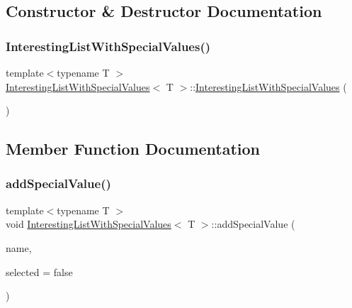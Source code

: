 \subsection{Constructor \& Destructor Documentation}
\mbox{\label{class_interesting_list_with_special_values_aac8922008e54bc7e28a392b1b85ead37}} 
\subsubsection{\texorpdfstring{InterestingListWithSpecialValues()}{InterestingListWithSpecialValues()}}
{\footnotesize\ttfamily template$<$typename T $>$ \\
\mbox{\hyperlink{class_interesting_list_with_special_values}{Interesting\+List\+With\+Special\+Values}}$<$ T $>$\+::\mbox{\hyperlink{class_interesting_list_with_special_values}{Interesting\+List\+With\+Special\+Values}} (\begin{DoxyParamCaption}{ }\end{DoxyParamCaption})\hspace{0.3cm}{\ttfamily [inline]}}



\subsection{Member Function Documentation}
\mbox{\label{class_interesting_list_with_special_values_a775cdd5ee99c643ebec718f41477d821}} 
\subsubsection{\texorpdfstring{addSpecialValue()}{addSpecialValue()}}
{\footnotesize\ttfamily template$<$typename T $>$ \\
void \mbox{\hyperlink{class_interesting_list_with_special_values}{Interesting\+List\+With\+Special\+Values}}$<$ T $>$\+::add\+Special\+Value (\begin{DoxyParamCaption}\item[{Q\+String}]{name,  }\item[{bool}]{selected = {\ttfamily false} }\end{DoxyParamCaption})\hspace{0.3cm}{\ttfamily [inline]}}

